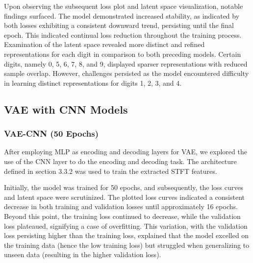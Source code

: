 \documentclass[12pt]{article}
\begin{document}
Upon observing the subsequent loss plot and latent space visualization, notable findings surfaced. The model demonstrated increased stability, as indicated by both losses exhibiting a consistent downward trend, persisting until the final epoch. This indicated continual loss reduction throughout the training process. Examination of the latent space revealed more distinct and refined representations for each digit in comparison to both preceding models. Certain digits, namely 0, 5, 6, 7, 8, and 9, displayed sparser representations with reduced sample overlap. However, challenges persisted as the model encountered difficulty in learning distinct representations for digits 1, 2, 3, and 4.

\subsection{VAE with CNN Models}

\subsubsection{VAE-CNN (50 Epochs)}
After employing MLP as encoding and decoding layers for VAE, we explored the use of the CNN layer to do the encoding and decoding task. The architecture defined in section 3.3.2 was used to train the extracted STFT features.

Initially, the model was trained for 50 epochs, and subsequently, the loss curves and latent space were scrutinized. The plotted loss curves indicated a consistent decrease in both training and validation losses until approximately 16 epochs. Beyond this point, the training loss continued to decrease, while the validation loss plateaued, signifying a case of overfitting. This variation, with the validation loss persisting higher than the training loss, explained that the model excelled on the training data (hence the low training loss) but struggled when generalizing to unseen data (resulting in the higher validation loss).
\end{document}
